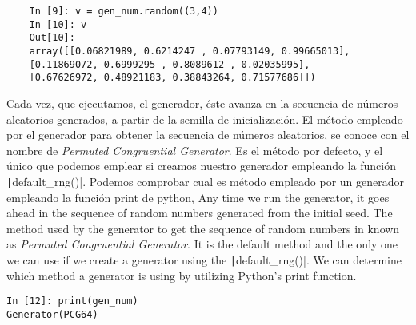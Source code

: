 \begin{center}
	\begin{minipage}{0.8\textwidth}
\begin{verbatim}
	In [9]: v = gen_num.random((3,4))
	In [10]: v
	Out[10]: 
	array([[0.06821989, 0.6214247 , 0.07793149, 0.99665013],
	[0.11869072, 0.6999295 , 0.8089612 , 0.02035995],
	[0.67626972, 0.48921183, 0.38843264, 0.71577686]])
\end{verbatim}
	\end{minipage}
\end{center}

\begin{paracol}{2}
Cada vez, que ejecutamos, el generador, éste avanza en la secuencia de números aleatorios generados, a partir de la semilla de inicialización. El método empleado por el generador para obtener la secuencia de números aleatorios, se conoce con el nombre de \emph{Permuted Congruential Generator}. Es el método por defecto, y el único que podemos emplear si creamos nuestro generador empleando la función \texttt|default_rng()|. Podemos comprobar cual es método empleado por un generador empleando la función print de python,
\switchcolumn
Any time we run the generator, it goes ahead in the sequence of random numbers	generated from the initial seed. The method used by the generator to get the sequence of random numbers in known as \emph{Permuted Congruential Generator}. It is the default method and the only one we can use if we create a generator using the \texttt|default_rng()|. We can determine which method a generator is using by utilizing Python's print function.
\end{paracol}

\begin{center}
	\begin{minipage}{0.3\textwidth}
\begin{verbatim}
In [12]: print(gen_num)
Generator(PCG64)
\end{verbatim}
\end{minipage}
\end{center}

